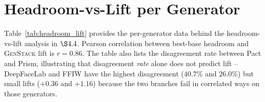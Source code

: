 \documentclass[10pt,twocolumn,letterpaper]{article}
\begin{document}
\section{Headroom-vs-Lift per Generator}
\label{sec:headroom_lift}

Table~\ref{tab:headroom_lift} provides the per-generator data behind the headroom-vs-lift analysis in $\S 4.4$. Pearson correlation between best-base headroom and \textsc{GenStack} lift is $r{=}0.86$. The table also lists the disagreement rate between Pact and Prism, illustrating that disagreement \emph{rate} alone does not predict lift -- DeepFaceLab and FFIW have the highest disagreement ($40.7\%$ and $26.0\%$) but small lifts ($+0.36$ and $+1.16$) because the two branches fail in correlated ways on those generators.
\end{document}

